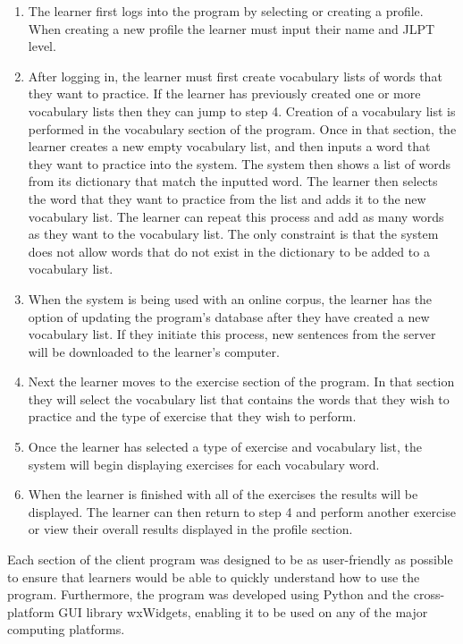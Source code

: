 \documentclass[english]{jnlp_1.4}
\begin{document}
\begin{enumerate}
\item The learner first logs into the program by selecting or creating a profile. When creating a new profile the learner must input their name and JLPT level.

\item After logging in, the learner must first create vocabulary lists of words that they want to practice. If the learner has previously created one or more vocabulary lists then they can jump to step 4. Creation of a vocabulary list is performed in the vocabulary section of the program. Once in that section, the learner creates a new empty vocabulary list, and then inputs a word that they want to practice into the system. The system then shows a list of words from its dictionary that match the inputted word. The learner then selects the word that they want to practice from the list and adds it to the new vocabulary list. The learner can repeat this process and add as many words as they want to the vocabulary list. The only constraint is that the system does not allow words that do not exist in the dictionary to be added to a vocabulary list. 

\item When the system is being used with an online corpus, the learner has the option of updating the program's database after they have created a new vocabulary list. If they initiate this process, new sentences from the server will be downloaded to the learner's computer.

\item Next the learner moves to the exercise section of the program. In that section they will select the vocabulary list that contains the words that they wish to practice and the type of exercise that they wish to perform. 

\item Once the learner has selected a type of exercise and vocabulary list, the system will begin displaying exercises for each vocabulary word.

\item When the learner is finished with all of the exercises the results will be displayed. The learner can then return to step 4 and perform another exercise or view their overall results displayed in the profile section.
\end{enumerate}

Each section of the client program was designed to be as user-friendly as possible to ensure that learners would be able to quickly understand how to use the program. Furthermore, the program was developed using Python and the cross-platform GUI library wxWidgets, enabling it to be used on any of the major computing platforms.
\end{document}
